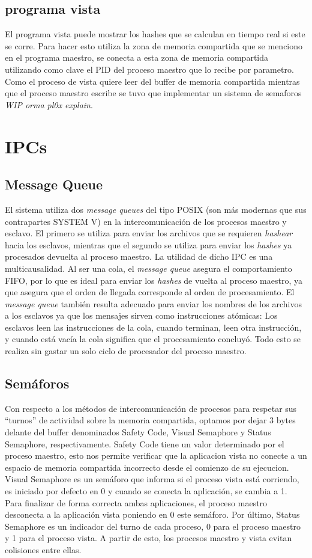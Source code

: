 \documentclass[10pt,a4paper]{report}
\begin{document}
\subsection{programa vista}
	El programa vista puede mostrar los hashes que se calculan en tiempo real si este se corre. Para hacer esto utiliza la zona de memoria compartida que se menciono en el programa maestro, se conecta a esta zona de memoria compartida utilizando como clave el PID del proceso maestro que lo recibe por parametro. Como el proceso de vista quiere leer del buffer de memoria compartida mientras que el proceso maestro escribe se tuvo que implementar un sistema de semaforos \emph{WIP orma pl0x explain}.
\section{IPCs}
\subsection{Message Queue}
	El sistema utiliza dos \textit{message queues} del tipo POSIX (son más modernas que sus contrapartes SYSTEM V) en la intercomunicación de los procesos maestro y esclavo. El primero se utiliza para enviar los archivos que se requieren \textit{hashear} hacia los esclavos, mientras que el segundo se utiliza para enviar los \textit{hashes} ya procesados devuelta al proceso maestro. La utilidad de dicho IPC es una multicausalidad. Al ser una cola, el \textit{message queue} asegura el comportamiento FIFO, por lo que es ideal para enviar los \textit{hashes} de vuelta al proceso maestro, ya que asegura que el orden de llegada corresponde al orden de procesamiento. El \textit{message queue} también resulta adecuado para enviar los nombres de los archivos a los esclavos ya que los mensajes sirven como instrucciones atómicas: Los esclavos leen las instrucciones de la cola, cuando terminan, leen otra instrucción, y cuando está vacía la cola significa que el procesamiento concluyó. Todo esto se realiza sin gastar un solo ciclo de procesador del proceso maestro.
\subsection{Semáforos} 
Con respecto a los métodos de intercomunicación de procesos para respetar sus “turnos” de actividad sobre la memoria compartida, optamos por dejar 3 bytes delante del buffer denominados Safety Code, Visual Semaphore y Status Semaphore, respectivamente. 
Safety Code tiene un valor determinado por el proceso maestro, esto nos permite verificar que la aplicacion vista no conecte a un espacio de memoria compartida incorrecto desde el comienzo de su ejecucion. 
Visual Semaphore es un semáforo que informa si el proceso vista está corriendo, es iniciado por defecto en 0 y cuando se conecta la aplicación, se cambia a 1. Para finalizar de forma correcta ambas aplicaciones, el proceso maestro desconecta a la aplicación vista poniendo en 0 este semáforo.
Por último, Status Semaphore es un indicador del turno de cada proceso, 0 para el proceso maestro y 1 para el proceso vista. A partir de esto, los procesos maestro y vista evitan colisiones entre ellas. 
\end{document}
